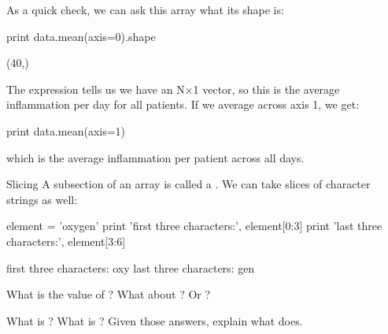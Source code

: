 As a quick check, we can ask this array what its shape is:

\begin{VerbIn}
print data.mean(axis=0).shape
\end{VerbIn}

\begin{VerbOut}
(40,)
\end{VerbOut}

The expression  tells us we have an N${\times}$1 vector, so this is
the average inflammation per day for all patients. If we average across
axis 1, we get:

\begin{VerbIn}
print data.mean(axis=1)
\end{VerbIn}

\begin{VerbOut}
[ 5.45   5.425  6.1    5.9    5.55   6.225  5.975  6.65   6.625  6.525
  6.775  5.8    6.225  5.75   5.225  6.3    6.55   5.7    5.85   6.55
  5.775  5.825  6.175  6.1    5.8    6.425  6.05   6.025  6.175  6.55
  6.175  6.35   6.725  6.125  7.075  5.725  5.925  6.15   6.075  5.75
  5.975  5.725  6.3    5.9    6.75   5.925  7.225  6.15   5.95   6.275  5.7
  6.1    6.825  5.975  6.725  5.7    6.25   6.4    7.05   5.9  ]
\end{VerbOut}

which is the average inflammation per patient across all days.

\begin{swcbox}{Slicing}
A subsection of an array is called a . We can
take slices of character strings as well:

\begin{VerbIn}
element = 'oxygen'
print 'first three characters:', element[0:3]
print 'last three characters:', element[3:6]
\end{VerbIn}

\begin{VerbOut}
first three characters: oxy
last three characters: gen
\end{VerbOut}
\end{swcbox}

\begin{challenge}
  What is the value of ? What about
  ? Or ?
\end{challenge}

\begin{challenge}
  What is ? What is ?
  Given those answers, explain what  does.
\end{challenge}

